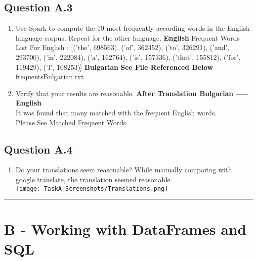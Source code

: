 \documentclass[12pt]{article}
\begin{document}
\subsection{Question A.3}
\begin{enumerate}
\item Use Spark to compute the 10 most frequently according words in the English language corpus. Repeat for the other language.
\newline
\newline
	\textbf{English}
	\newline
    \newline
    Frequent Words List For English : [('the', 698563), ('of', 362452), ('to', 326291), ('and', 293700), ('in', 222084), ('a', 162764), ('is', 157336), ('that', 155812), ('for', 119429), ('I', 108253)]
	\newline
    \newline
    \textbf{Bulgarian}
    \newline
    \newline
    \textbf{See File Referenced Below}
    \newline
    \href{run:./frequentsBulgarian.txt}{frequentsBulgarian.txt}
\newline
\item Verify that your results are reasonable.
\newline
\newline
	\textbf{After Translation Bulgarian ----- English} \\
    It was found that many matched with the frequent English words. \\
    Please See \href{run:./matchedWords.txt}{Matched Frequent Words}
\end{enumerate}
\newpage
\subsection{Question A.4}
\begin{enumerate}
\item Do your translations seem reasonable? 
\newline
\newline
	While manually comparing with google translate, the translation seemed reasonable. \\
    \newline
    \texttt{[image: TaskA\_Screenshots/Translations.png]}
\end{enumerate}
\hrule
\newpage
\section{B - Working with DataFrames and SQL}
\end{document}
